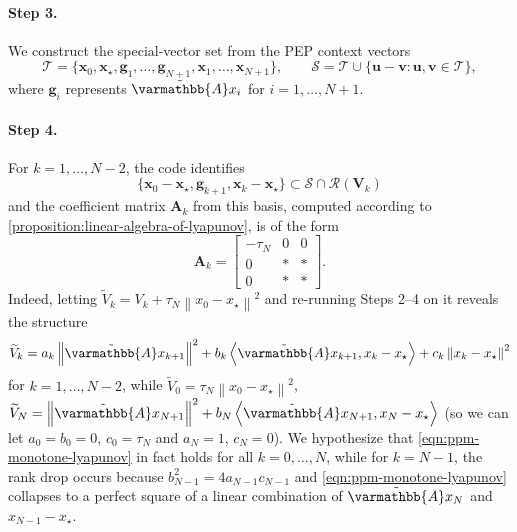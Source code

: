 \documentclass{article}
\theoremstyle{definition}
\theoremstyle{plain}
\newcommand{\vg}{{\mathbf{g}}}
\newcommand{\vu}{{\mathbf{u}}}
\newcommand{\vv}{{\mathbf{v}}}
\newcommand{\vx}{{\mathbf{x}}}
\newcommand{\vA}{{\mathbf{A}}}
\newcommand{\vV}{{\mathbf{V}}}
\newcommand{\cR}{{\mathcal{R}}}
\newcommand{\cS}{{\mathcal{S}}}
\newcommand{\cT}{{\mathcal{T}}}
\newcommand{\opA}{{\varmathbb{A}}}
\newcommand{\inprod}[2]{\left\langle #1,#2 \right\rangle}
\newcommand{\sqnorm}[1]{\left\| #1 \right\|^2}
\newcommand{\topa}{\tilde{\opA}}
\newcommand{\bmat}[1]{\begin{bmatrix} #1 \end{bmatrix}}
\begin{document}
\paragraph{Step 3.}
We construct the special-vector set from the PEP context vectors
\[
    \cT=\{\vx_0,\vx_\star,\vg_1,\dots,\vg_{N+1},\vx_1,\dots,\vx_{N+1}\},
    \qquad
    \cS=\cT\cup\{\vu-\vv:\vu,\vv\in\cT\},
\]
where $\vg_i$ represents $\topa x_i$ for $i=1,\dots,N+1$.

\paragraph{Step 4.}
For $k=1,\dots,N-2$, the code identifies
\[
    \{\vx_0 - \vx_\star, \vg_{k+1}, \vx_k-\vx_\star\}\subset \cS\cap\cR(\vV_k)
\]
and the coefficient matrix $\vA_k$ from this basis, computed according to \cref{proposition:linear-algebra-of-lyapunov}, is of the form
\[
    \vA_k = \bmat{-\tau_N & 0 & 0 \\ 0 & * & * \\ 0 & * & * } .
\]
Indeed, letting $\widetilde{V}_k = V_k + \tau_N \sqnorm{x_0 - x_\star}$ and re-running Steps 2--4 on it reveals the structure
\begin{align}
\label{eqn:ppm-monotone-lyapunov}
    \widetilde{V}_k = a_k \sqnorm{\topa x_{k+1}} + b_k \inprod{\topa x_{k+1}}{x_k-x_\star} + c_k \sqnorm{x_k-x_\star}
\end{align}
for $k=1,\dots,N-2$, while $\widetilde{V}_0 = \tau_N \sqnorm{x_0 - x_\star}$, $\widetilde{V}_N = \sqnorm{\topa x_{N+1}} + b_N \inprod{\topa x_{N+1}}{x_N - x_\star}$ (so we can let $a_0 = b_0 = 0$, $c_0 = \tau_N$ and $a_N = 1$, $c_N = 0$).
We hypothesize that \eqref{eqn:ppm-monotone-lyapunov} in fact holds for all $k=0,\dots,N$, while for $k=N-1$, the rank drop occurs because $b_{N-1}^2 = 4a_{N-1} c_{N-1}$ and \eqref{eqn:ppm-monotone-lyapunov} collapses to a perfect square of a linear combination of $\topa x_N$ and $x_{N-1} - x_\star$.
\end{document}
